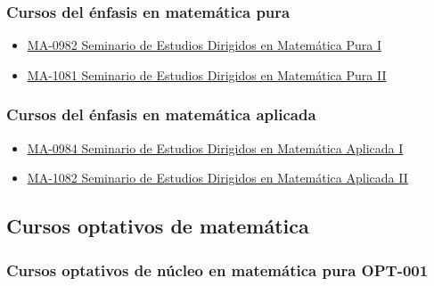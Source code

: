 \subsubsection*{Cursos del énfasis en matemática pura}
\begin{itemize}
    \item \hyperlink{MA0982}{MA-0982 Seminario de Estudios Dirigidos en Matemática Pura I}
    \item \hyperlink{MA1081Pura}{MA-1081 Seminario de Estudios Dirigidos en Matemática Pura II}
\end{itemize}

\subsubsection*{Cursos del énfasis en matemática aplicada}
\begin{itemize}
    \item \hyperlink{MA0984}{MA-0984 Seminario de Estudios Dirigidos en Matemática Aplicada I}
    \item \hyperlink{MA1082}{MA-1082 Seminario de Estudios Dirigidos en Matemática Aplicada II}
\end{itemize}

\subsection{Cursos optativos de matemática}
\subsubsection*{Cursos optativos de núcleo en matemática pura OPT-001}

